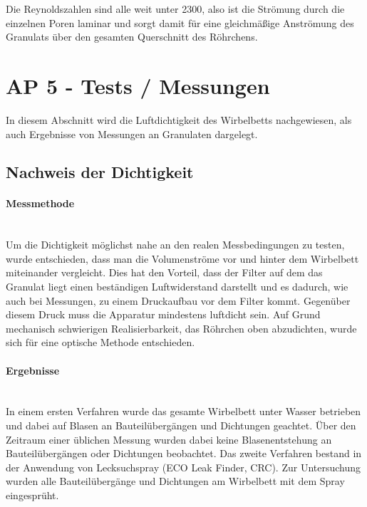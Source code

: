 Die Reynoldszahlen sind alle weit unter 2300, also ist die Strömung durch die einzelnen Poren laminar und sorgt damit für eine gleichmäßige Anströmung des Granulats über den gesamten Querschnitt des Röhrchens.

\newpage

\section{AP 5 - Tests / Messungen}

In diesem Abschnitt wird die Luftdichtigkeit des Wirbelbetts nachgewiesen, als auch Ergebnisse von Messungen an Granulaten dargelegt.

\subsection{Nachweis der Dichtigkeit}

\paragraph{Messmethode}
\hfill \\
Um die Dichtigkeit möglichst nahe an den realen Messbedingungen zu testen, wurde entschieden, dass man die Volumenströme vor und hinter dem Wirbelbett miteinander vergleicht. Dies hat den Vorteil, dass der Filter auf dem das Granulat liegt einen beständigen Luftwiderstand darstellt und es dadurch, wie auch bei Messungen, zu einem Druckaufbau vor dem Filter kommt. Gegenüber diesem Druck muss die Apparatur mindestens luftdicht sein. Auf Grund mechanisch schwierigen Realisierbarkeit, das Röhrchen oben abzudichten, wurde sich für eine optische Methode entschieden.

\paragraph{Ergebnisse}
\hfill \\

In einem ersten Verfahren wurde das gesamte Wirbelbett unter Wasser betrieben und dabei auf Blasen an Bauteilübergängen und Dichtungen geachtet. Über den Zeitraum einer üblichen Messung wurden dabei keine Blasenentstehung an Bauteilübergängen oder Dichtungen beobachtet. 
Das zweite Verfahren bestand in der Anwendung von Lecksuchspray (ECO Leak Finder, CRC). Zur Untersuchung wurden alle Bauteilübergänge und Dichtungen am Wirbelbett mit dem Spray eingesprüht. 


